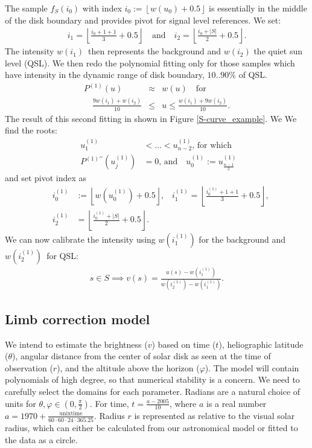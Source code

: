 \documentclass{aa}
\newcommand{\eqnl}[2]{\begin{eqnarray}\label{#1}#2\end{eqnarray}}
\newcommand{\floor}[1]{\left\lfloor #1 \right\rfloor}
\begin{document}
The sample $f_S(i_0)$ with index $i_0 := \floor{w(u_0)+0.5}$ is essentially in the middle of the disk boundary and provides pivot for signal level references. We set:
\eqnl{scurve-pivots}{
i_1 = \floor{\frac{i_0 + 1 + 1}{3} + 0.5} \quad \text{and} \quad i_2 = \floor{\frac{i_0 + |S|}{2} + 0.5} \text{.}
}
The intensity $w(i_1)$ then represents the background and $w(i_2)$ the quiet sun level (QSL). We then redo the polynomial fitting only for those samples which have intensity in the dynamic range of disk boundary, $10 .. 90 \%$ of QSL.
\eqnl{scurve-approx1}{
P^{(1)}(u) &\approx& w(u) \quad \text{for}\\ \quad \frac{9 w(i_1) + w(i_2)}{10} &\le& u \le \frac{w(i_1) + 9 w(i_2)}{10} \text{.} \nonumber
}
The result of this second fitting in shown in Figure \ref{S-curve_example}. We We find the roots:
\eqnl{scurve-roots1}{
&u_1^{(1)}& < ... < u_{n-2}^{(1)} \text{, for which} \quad \\
&P^{(1)\prime\prime}(u_j^{(1)})& = 0 \text{, and} \quad 
u_0^{(1)} := u_{\frac{n-1}{2}}^{(1)} \nonumber 
}
and set pivot index
as
\eqnl{scurve-pivots1}{
&i_0^{(1)}& := \floor{w(u_0^{(1)})+0.5}
\text{,}
\quad i_1^{(1)} = \floor{\frac{i_0^{(1)} + 1 + 1}{3} + 0.5} 
\text{,} 
\nonumber \\
&i_2^{(1)}& = \floor{\frac{i_0^{(1)} + |S|}{2} + 0.5} \text{.}
}
We can now calibrate the intensity using $w(i_1^{(1)})$ for the background and $w(i_2^{(1)})$ for QSL:
\eqnl{scurve-calibration}{
s \in S \implies v(s) = \frac{u(s) - w(i_1^{(1)})}{w(i_2^{(1)}) - w(i_1^{(1)})} \text{.}
}

\subsection{Limb correction model}

We intend to estimate the brightness ($v$) based on time ($t$), heliographic latitude ($\theta$), angular distance from the 
center of solar disk as seen at the time of observation ($r$), and the altitude above the horizon ($\varphi$). The model 
will contain polynomials of high degree, so that numerical stability is a concern. We need to carefully select the 
domains for each parameter. Radians are a natural choice of units for $\theta, \varphi \in \left( 0, \frac{\pi}{2} 
\right)$. For time, $t = \frac{a - 2005}{10}$, where $a$ is a real number $a = 1970 + 
\frac{\mathrm{unixtime}}{60\cdot60\cdot24\cdot365.25}$. Radius $r$ is represented as relative to the visual solar radius, which can 
either be calculated from our astronomical model or fitted to the data as a circle.
\end{document}
